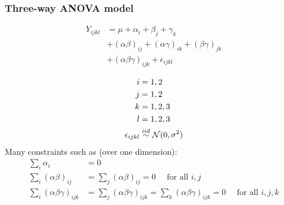 \subsubsection*{Three-way ANOVA model}
$$
\begin{aligned}
Y_{ijkl} &= \mu + \alpha_i + \beta_j + \gamma_k\\
&+ (\alpha \beta)_{ij} + (\alpha \gamma)_{ik} + (\beta \gamma)_{jk}\\
&+ (\alpha\beta \gamma)_{ijk} + \epsilon_{ijkl}\\
\end{aligned}
$$
$$
\begin{aligned}
	i &= 1, 2\\
	j &= 1, 2\\
	k &= 1, 2, 3\\
	l &= 1, 2, 3\\
	\epsilon_{ijkl} &\overset{iid}{\sim} \mathcal{N}(0, \sigma^2)\\	
\end{aligned}
$$
Many constraints such as (over one dimension):
$$
\begin{aligned}
	\sum\limits_i \alpha_i &= 0\\
	\sum\limits_i (\alpha \beta)_{ij} &= \sum\limits_j (\alpha \beta)_{ij} = 0 \quad \mbox{ for all } i, j\\
	\sum\limits_i (\alpha \beta \gamma)_{ijk} &=  \sum\limits_j (\alpha \beta \gamma)_{ijk} = \sum\limits_k (\alpha \beta \gamma)_{ijk} = 0 \quad \mbox{ for all }i, j, k\\
\end{aligned}
$$


